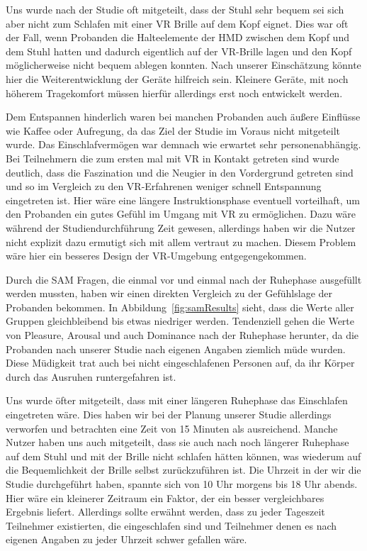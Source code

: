Uns wurde nach der Studie oft mitgeteilt, dass der Stuhl sehr bequem sei sich aber nicht zum Schlafen mit einer VR Brille auf dem Kopf eignet. 
Dies war oft der Fall, wenn Probanden die Halteelemente der HMD zwischen dem Kopf und dem Stuhl hatten und dadurch eigentlich auf der VR-Brille lagen und den Kopf möglicherweise nicht bequem ablegen konnten. 
Nach unserer Einschätzung könnte hier die Weiterentwicklung der Geräte hilfreich sein. Kleinere Geräte, mit noch höherem Tragekomfort müssen hierfür allerdings erst noch entwickelt werden.

Dem Entspannen hinderlich waren bei manchen Probanden auch äußere Einflüsse wie Kaffee oder Aufregung, da das Ziel der Studie im Voraus nicht mitgeteilt wurde. Das Einschlafvermögen war demnach wie erwartet sehr personenabhängig.
Bei Teilnehmern die zum ersten mal mit VR in Kontakt getreten sind wurde deutlich, dass die Faszination und die Neugier in den Vordergrund getreten sind und so im Vergleich zu den VR-Erfahrenen weniger schnell Entspannung eingetreten ist. 
Hier wäre eine längere Instruktionsphase eventuell vorteilhaft, um den Probanden ein gutes Gefühl im Umgang mit VR zu ermöglichen. 
Dazu wäre während der Studiendurchführung Zeit gewesen, allerdings haben wir die Nutzer nicht explizit dazu ermutigt sich mit allem vertraut zu machen. Diesem Problem wäre hier ein besseres Design der VR-Umgebung entgegengekommen.

Durch die SAM Fragen, die einmal vor und einmal nach der Ruhephase ausgefüllt werden mussten, haben wir einen direkten Vergleich zu der Gefühlslage der Probanden bekommen. In Abbildung~\ref{fig:samResults} sieht, dass die Werte aller Gruppen gleichbleibend bis etwas niedriger werden. Tendenziell gehen die Werte von Pleasure, Arousal und auch Dominance nach der Ruhephase herunter, da die Probanden nach unserer Studie nach eigenen Angaben ziemlich müde wurden. Diese Müdigkeit trat auch bei nicht eingeschlafenen Personen auf, da ihr Körper durch das Ausruhen runtergefahren ist. 

Uns wurde öfter mitgeteilt, dass mit einer längeren Ruhephase das Einschlafen eingetreten wäre. Dies haben wir bei der Planung unserer Studie allerdings verworfen und betrachten eine Zeit von 15 Minuten als ausreichend.
Manche Nutzer haben uns auch mitgeteilt, dass sie auch nach noch längerer Ruhephase auf dem Stuhl und mit der Brille nicht schlafen hätten können, was wiederum auf die Bequemlichkeit der Brille selbst zurückzuführen ist.
Die Uhrzeit in der wir die Studie durchgeführt haben, spannte sich von 10 Uhr morgens bis 18 Uhr abends. Hier wäre ein kleinerer Zeitraum ein Faktor, der ein besser vergleichbares Ergebnis liefert. 
Allerdings sollte erwähnt werden, dass zu jeder Tageszeit Teilnehmer existierten, die eingeschlafen sind und Teilnehmer denen es nach eigenen Angaben zu jeder Uhrzeit schwer gefallen wäre.

